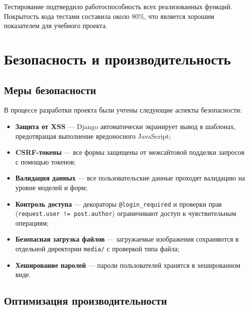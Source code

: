\documentclass[pract,och,bachelor]{SCWorks}
\begin{document}
Тестирование подтвердило работоспособность всех реализованных функций. Покрытость кода тестами составила около 80\%, что является хорошим показателем для учебного проекта.

\section{Безопасность и производительность}

\subsection{Меры безопасности}

В процессе разработки проекта были учтены следующие аспекты безопасности:
\begin{itemize}
    \item \textbf{Защита от XSS} --- Django автоматически экранирует вывод в шаблонах, предотвращая выполнение вредоносного JavaScript;
    \item \textbf{CSRF-токены} --- все формы защищены от межсайтовой подделки запросов с помощью токенов;
    \item \textbf{Валидация данных} --- все пользовательские данные проходят валидацию на уровне моделей и форм;
    \item \textbf{Контроль доступа} --- декораторы \texttt{@login\_required} и проверки прав (\texttt{request.user != post.author}) ограничивают доступ к чувствительным операциям;
    \item \textbf{Безопасная загрузка файлов} --- загружаемые изображения сохраняются в отдельной директории \texttt{media/} с проверкой типа файла;
    \item \textbf{Хеширование паролей} --- пароли пользователей хранятся в хешированном виде.
\end{itemize}

\subsection{Оптимизация производительности}
\end{document}
